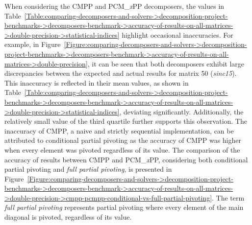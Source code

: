 When considering the CMPP and PCM\_\textit{x}PP decomposers, the values in Table~\ref{Table:comparing-decomposers-and-solvers->decomposition-project-benchmarks->decomposers-benchmark->accuracy-of-results-on-all-matrices->double-precision->statistical-indices} highlight occasional inaccuracies. For example, in Figure~\ref{Figure:comparing-decomposers-and-solvers->decomposition-project-benchmarks->decomposers-benchmark->accuracy-of-results-on-all-matrices->double-precision}, it can be seen that both decomposers exhibit large discrepancies between the expected and actual results for matrix 50 (\textit{sinc15}). This inaccuracy is reflected in their mean values, as shown in Table~\ref{Table:comparing-decomposers-and-solvers->decomposition-project-benchmarks->decomposers-benchmark->accuracy-of-results-on-all-matrices->double-precision->statistical-indices}, deviating significantly. Additionally, the relatively small value of the third quartile further supports this observation. The inaccuracy of CMPP, a naive and strictly sequential implementation, can be attributed to conditional partial pivoting as the accuracy of CMPP was higher when every element was pivoted regardless of its value. The comparison of the accuracy of results between CMPP and PCM\_\textit{x}PP, considering both conditional partial pivoting and \textit{full partial pivoting}, is presented in Figure~\ref{Figure:comparing-decomposers-and-solvers->decomposition-project-benchmarks->decomposers-benchmark->accuracy-of-results-on-all-matrices->double-precision->cmpp-pcmpp-conditional-vs-full-partial-pivoting}. The term \textit{full partial pivoting} represents partial pivoting where every element of the main diagonal is pivoted, regardless of its value.

